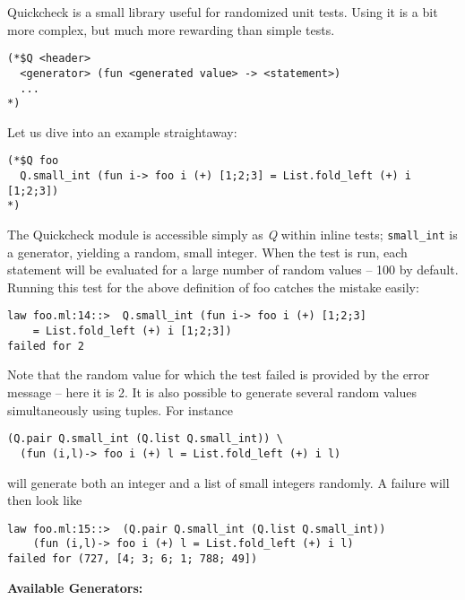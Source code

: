 \documentclass[a4paper,12pt]{article}
\begin{document}
Quickcheck is a small library useful for randomized unit tests. Using it is a bit more
complex, but much more rewarding than simple tests.

\begin{verbatim}
(*$Q <header>
  <generator> (fun <generated value> -> <statement>)
  ...
*)
\end{verbatim}

Let us dive into an example straightaway:

\begin{verbatim}
(*$Q foo
  Q.small_int (fun i-> foo i (+) [1;2;3] = List.fold_left (+) i [1;2;3])
*)
\end{verbatim}

The Quickcheck module is accessible simply as \emph{Q} within inline tests; \texttt{small\_int} is a
generator, yielding a random, small integer. When the test is run, each statement will be
evaluated for a large number of random values -- 100 by default. Running this test for the
above definition of foo catches the mistake easily:

{\Oconsole\begin{verbatim}
law foo.ml:14::>  Q.small_int (fun i-> foo i (+) [1;2;3]
    = List.fold_left (+) i [1;2;3])
failed for 2
\end{verbatim} }

Note that the random value for which the test failed is provided by the error message --
here it is 2. It is also possible to generate several random values simultaneously using
tuples. For instance


\begin{verbatim}
(Q.pair Q.small_int (Q.list Q.small_int)) \
  (fun (i,l)-> foo i (+) l = List.fold_left (+) i l)
\end{verbatim} 
    
will generate both an integer and a list of small integers randomly. A failure will then
look like

{\Oconsole\begin{verbatim}
law foo.ml:15::>  (Q.pair Q.small_int (Q.list Q.small_int))
    (fun (i,l)-> foo i (+) l = List.fold_left (+) i l)
failed for (727, [4; 3; 6; 1; 788; 49])
\end{verbatim}}

\textbf{Available Generators:}
\end{document}
